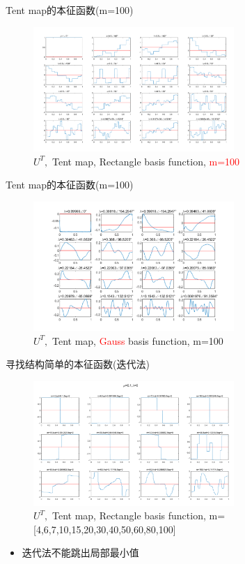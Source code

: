 \documentclass{beamer}
\begin{document}
\begin{frame}{Tent map的本征函数(m=100)}
	\begin{figure}
		\centering
		\includegraphics[width=3in]{figure/tent_eigen_m100}
		\caption{$U^T,$ Tent map, Rectangle basis function, \textcolor{red}{m=100}}
	\end{figure}
\end{frame}

\begin{frame}{Tent map的本征函数(m=100)}
	\begin{figure}
		\centering
		\includegraphics[width=3in]{figure/tent_eigen_gauss}
		\caption{$U^T,$ Tent map, \textcolor{red}{Gauss} basis function, m=100}
	\end{figure}
\end{frame}

\begin{frame}{寻找结构简单的本征函数(迭代法)}
	\begin{figure}
		\centering
		\includegraphics[width=3in]{figure/tent_iter_minimun}
		\caption{$U^T,$ Tent map, Rectangle basis function, m=[4,6,7,10,15,20,30,40,50,60,80,100]}
	\end{figure}
	\begin{itemize}
		\item 迭代法不能跳出局部最小值
	\end{itemize}
\end{frame}
\end{document}
